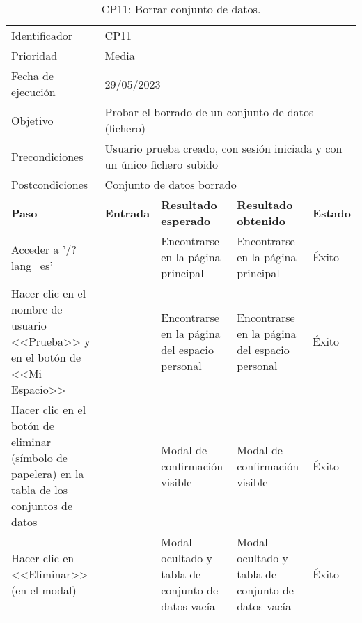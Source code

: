     \begin{center}
    \begin{table}[H]
    \begin{tabular}{p{}p{}p{}p{}p{}}
    \rowcolor{gray!25}
    Identificador   & \multicolumn{4}{l}{CP11}                                                   \\
    Prioridad   & \multicolumn{4}{l}{Media}                                                    \\
    \rowcolor{gray!25}
    Fecha de ejecución   & \multicolumn{4}{l}{29/05/2023}                                                    \\
    Objetivo        & \multicolumn{4}{p{0.80\textwidth}}{Probar el borrado de un conjunto de datos (fichero)}                                                     \\
    \rowcolor{gray!25}
    Precondiciones  & \multicolumn{4}{p{0.80\textwidth}}{Usuario prueba creado, con sesión iniciada y con un único fichero subido}                                                     \\
    Postcondiciones & \multicolumn{4}{l}{Conjunto de datos borrado}                                                     \\ \hline
    \rowcolor{gray!25}
    \textbf{Paso}   & \textbf{Entrada} & \textbf{Resultado esperado} & \textbf{Resultado obtenido} & \textbf{Estado} \\ \hline
    Acceder a '/?lang=es'                                 &                        & Encontrarse en la página principal                                   & Encontrarse en la página principal                           & Éxito  \\ \hline
    Hacer clic en el nombre de usuario <<Prueba>> y en el botón de <<Mi Espacio>>  &     & Encontrarse en la página del espacio personal                  & Encontrarse en la página del espacio personal                       & Éxito  \\ \hline 
    Hacer clic en el botón de eliminar (símbolo de papelera) en la tabla de los conjuntos de datos &                     & Modal de confirmación visible                                     & Modal de confirmación visible                     & Éxito                            \\ \hline
    Hacer clic en <<Eliminar>> (en el modal)              &                        & Modal ocultado y tabla de conjunto de datos vacía                    & Modal ocultado y tabla de conjunto de datos vacía            & Éxito                            \\ \hline
    \end{tabular}
    \caption{CP11: Borrar conjunto de datos.}
    \end{table}
    \end{center}
    
